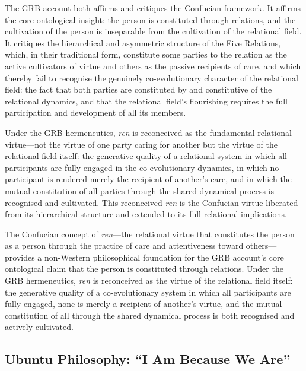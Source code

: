 The GRB account both affirms and critiques the Confucian framework. It affirms the core ontological insight: the person is constituted through relations, and the cultivation of the person is inseparable from the cultivation of the relational field. It critiques the hierarchical and asymmetric structure of the Five Relations, which, in their traditional form, constitute some parties to the relation as the active cultivators of virtue and others as the passive recipients of care, and which thereby fail to recognise the genuinely co-evolutionary character of the relational field: the fact that both parties are constituted by and constitutive of the relational dynamics, and that the relational field's flourishing requires the full participation and development of all its members.

Under the GRB hermeneutics, \emph{ren} is reconceived as the fundamental relational virtue---not the virtue of one party caring for another but the virtue of the relational field itself: the generative quality of a relational system in which all participants are fully engaged in the co-evolutionary dynamics, in which no participant is rendered merely the recipient of another's care, and in which the mutual constitution of all parties through the shared dynamical process is recognised and cultivated. This reconceived \emph{ren} is the Confucian virtue liberated from its hierarchical structure and extended to its full relational implications.

\begin{claim}
The Confucian concept of \emph{ren}---the relational virtue that constitutes the person as a person through the practice of care and attentiveness toward others---provides a non-Western philosophical foundation for the GRB account's core ontological claim that the person is constituted through relations. Under the GRB hermeneutics, \emph{ren} is reconceived as the virtue of the relational field itself: the generative quality of a co-evolutionary system in which all participants are fully engaged, none is merely a recipient of another's virtue, and the mutual constitution of all through the shared dynamical process is both recognised and actively cultivated.
\end{claim}

\subsection{Ubuntu Philosophy: ``I Am Because We Are''}
\label{p14:subsec:ubuntu}

